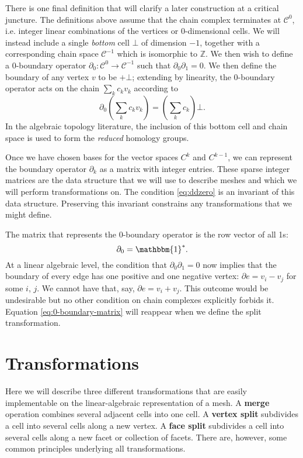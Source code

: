 \documentclass[twocolumn]{article}
\begin{document}
There is one final definition that will clarify a later construction at a critical juncture.
The definitions above assume that the chain complex terminates at $\mathscr{C}^0$, i.e. integer linear combinations of the vertices or 0-dimensional cells.
We will instead include a single \emph{bottom} cell $\bot$ of dimension $-1$, together with a corresponding chain space $\mathscr{C}^{-1}$ which is isomorphic to $\mathbb{Z}$.
We then wish to define a 0-boundary operator $\partial_0 : \mathscr{C}^0 \to \mathscr{C}^{-1}$ such that $\partial_0\partial_1 = 0$.
We then define the boundary of any vertex $v$ to be $+\bot$; extending by linearity, the 0-boundary operator acts on the chain $\sum_kc_kv_k$ according to
\begin{equation}
    \partial_0\left(\sum_kc_kv_k\right) = \left(\sum_kc_k\right)\bot.
\end{equation}
In the algebraic topology literature, the inclusion of this bottom cell and chain space is used to form the \emph{reduced} homology groups.

Once we have chosen bases for the vector spaces $C^k$ and $C^{k - 1}$, we can represent the boundary operator $\partial_k$ as a matrix with integer entries.
These sparse integer matrices are the data structure that we will use to describe meshes and which we will perform transformations on.
The condition \eqref{eq:ddzero} is an invariant of this data structure.
Preserving this invariant constrains any transformations that we might define.

The matrix that represents the 0-boundary operator is the row vector of all 1s:
\begin{equation}
    \partial_0 = \mathbbm{1}^*.
    \label{eq:0-boundary-matrix}
\end{equation}
At a linear algebraic level, the condition that $\partial_0\partial_1 = 0$ now implies that the boundary of every edge has one positive and one negative vertex: $\partial e = v_i - v_j$ for some $i$, $j$.
We cannot have that, say, $\partial e = v_i + v_j$.
This outcome would be undesirable but no other condition on chain complexes explicitly forbids it.
Equation \eqref{eq:0-boundary-matrix} will reappear when we define the split transformation.


\section{Transformations}

Here we will describe three different transformations that are easily implementable on the linear-algebraic representation of a mesh.
A \textbf{merge} operation combines several adjacent cells into one cell.
A \textbf{vertex split} subdivides a cell into several cells along a new vertex.
A \textbf{face split} subdivides a cell into several cells along a new facet or collection of facets.
There are, however, some common principles underlying all transformations.
\end{document}
